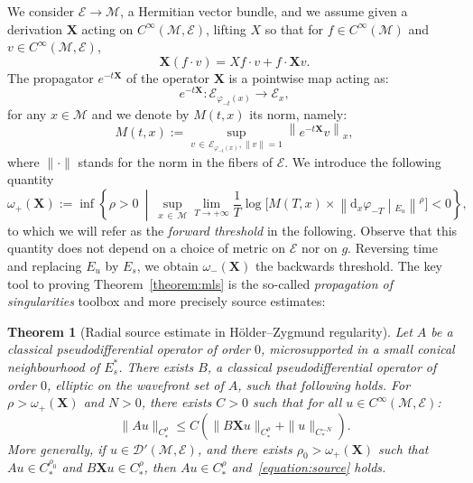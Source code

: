 \documentclass[10pt]{amsart}
\newtheorem{theo}{Theorem}[section]
\theoremstyle{definition}\newtheorem{defi}[theo]{Definition}\newtheorem{rema}[theo]{Remark}\newtheorem{exam}[theo]{Example}\newtheorem{exem}[theo]{Example}\newtheorem{nota}[theo]{Notation}
\newcommand{\X}{\mathbf{X}}
\newcommand{\M}{\mathcal{M}}
\newcommand{\E}{\mathcal{E}}
\newcommand{\clD}{\mathcal{D}}
\newcommand{\dd}{\mathrm{d}}
\begin{document}
We consider $\E\to\M$, a Hermitian vector bundle, and we assume given a derivation $\X$ acting on $C^\infty(\M,\E)$, lifting $X$ so that for $f\in C^\infty(\M)$ and $v\in C^\infty(\M,\E)$,
\begin{equation}\label{equation:lie}
\X(f \cdot v) = Xf \cdot v + f \cdot \X v.
\end{equation}
The propagator $e^{-t \X}$ of the operator $\X$ is a pointwise map acting as:
\[
e^{-t\X} : \E_{\varphi_{-t}(x)} \rightarrow \E_x,
\]
for any $x \in \M$ and we denote by $M(t,x)$ its norm, namely:
\[
M(t,x) := \sup_{v\,\in\,\E_{\varphi_{-t}(x)}, \|v\|=1} \left\|e^{-t\X} v\right\|_x,
\]
where $\|\cdot\|$ stands for the norm in the fibers of $\E$. We introduce the following quantity
\begin{equation}\label{equation:threshold}
\omega_+(\X) := \inf\left\{ \rho > 0~\middle|~\sup_{x\,\in\,\M} \lim_{T\to + \infty} \frac{1}{T}\log \Big[M(T,x) \times \left\| \dd_x \varphi_{-T}\middle|_{E_u} \right\|^\rho\Big] < 0 \right\},
\end{equation}
to which we will refer as the \emph{forward threshold} in the following. Observe that this quantity does not depend on a choice of metric on $\E$ nor on $g$. Reversing time and replacing $E_u$ by $E_s$, we obtain $\omega_-(\X)$ the backwards threshold. The key tool to proving Theorem~\ref{theorem:mls} is the so-called \emph{propagation of singularities} toolbox and more precisely source estimates:


\begin{theo}[Radial source estimate in H\"older--Zygmund regularity]\label{theorem:source}
Let $A$ be a classical pseudodifferential operator of order $0$, microsupported in a small conical neighbourhood of $E^\ast_s$. There exists $B$, a classical pseudodifferential operator of order $0$, elliptic on the wavefront set of $A$, such that following holds. For $\rho>\omega_+(\X)$ and $N>0$, there exists $C>0$ such that for all $u\in C^\infty(\M,\E)$:
\begin{equation}\label{equation:source}
\| A u\|_{C^\rho_\ast} \leq C\left(\| B \X u \|_{C^\rho_\ast} + \| u \|_{C_*^{-N}}\right).
\end{equation}
More generally, if $u\in \clD'(\M,\E)$, and there exists $\rho_0 > \omega_+(\X)$ such that $Au \in C^{\rho_0}_\ast$ and $B \X u \in C^\rho_\ast$, then $A u \in C^{\rho}_\ast$ and~\eqref{equation:source} holds.
\end{theo}
\end{document}
